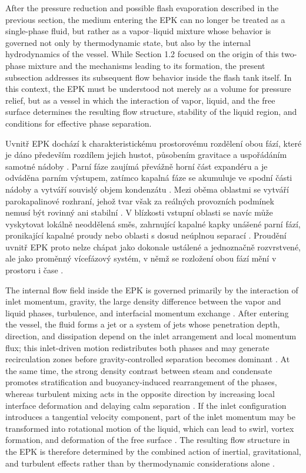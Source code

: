 After the pressure reduction and possible flash evaporation described in the previous section, the medium entering the EPK can no longer be treated as a single-phase fluid, but rather as a vapor–liquid mixture whose behavior is governed not only by thermodynamic state, but also by the internal hydrodynamics of the vessel. While Section 1.2 focused on the origin of this two-phase mixture and the mechanisms leading to its formation, the present subsection addresses its subsequent flow behavior inside the flash tank itself. In this context, the EPK must be understood not merely as a volume for pressure relief, but as a vessel in which the interaction of vapor, liquid, and the free surface determines the resulting flow structure, stability of the liquid region, and conditions for effective phase separation.

Uvnitř EPK dochází k charakteristickému prostorovému rozdělení obou fází, které je dáno především rozdílem jejich hustot, působením gravitace a uspořádáním samotné nádoby \cite{IshiiHibiki2011,HarunEtAl2019}. Parní fáze zaujímá převážně horní část expandéru a je odváděna parním výstupem, zatímco kapalná fáze se akumuluje ve spodní části nádoby a vytváří souvislý objem kondenzátu \cite{HarunEtAl2019}. Mezi oběma oblastmi se vytváří parokapalinové rozhraní, jehož tvar však za reálných provozních podmínek nemusí být rovinný ani stabilní \cite{IshiiHibiki2011,CarusoEtAl2016}. V blízkosti vstupní oblasti se navíc může vyskytovat lokálně neoddělená směs, zahrnující kapalné kapky unášené parní fází, pronikající kapalné proudy nebo oblasti s dosud neúplnou separací \cite{HarunEtAl2019}. Proudění uvnitř EPK proto nelze chápat jako dokonale ustálené a jednoznačně rozvrstvené, ale jako proměnný vícefázový systém, v němž se rozložení obou fází mění v prostoru i čase \cite{IshiiHibiki2011,CarusoEtAl2016}.

The internal flow field inside the EPK is governed primarily by the interaction of inlet momentum, gravity, the large density difference between the vapor and liquid phases, turbulence, and interfacial momentum exchange \cite{IshiiHibiki2011}. After entering the vessel, the fluid forms a jet or a system of jets whose penetration depth, direction, and dissipation depend on the inlet arrangement and local momentum flux; this inlet-driven motion redistributes both phases and may generate recirculation zones before gravity-controlled separation becomes dominant \cite{LeeEtAl2019}. At the same time, the strong density contrast between steam and condensate promotes stratification and buoyancy-induced rearrangement of the phases, whereas turbulent mixing acts in the opposite direction by increasing local interface deformation and delaying calm separation \cite{IshiiHibiki2011}. If the inlet configuration introduces a tangential velocity component, part of the inlet momentum may be transformed into rotational motion of the liquid, which can lead to swirl, vortex formation, and deformation of the free surface \cite{CarusoEtAl2016}. The resulting flow structure in the EPK is therefore determined by the combined action of inertial, gravitational, and turbulent effects rather than by thermodynamic considerations alone \cite{IshiiHibiki2011}.

